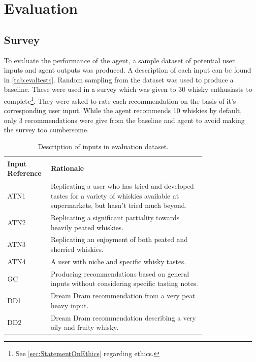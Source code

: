 \section{Evaluation}\label{sec:eval}
\subsection{Survey}\label{sec:survey}
To evaluate the performance of the agent, a sample dataset of potential user inputs and agent outputs 
was produced.  A description of each input can be found in \autoref{tab:evaltests}. Random sampling from the dataset was used to produce a baseline.  These were 
used in a survey which was given to 30 whisky enthusiasts to complete\footnote{See \autoref{sec:StatementOnEthics}
regarding ethics.}. They were asked to rate each recommendation on the basis of it's corresponding user input.  
While the agent recommends 10 whiskies by default, only 3 recommendations were give from the baseline and agent
to avoid making the survey too cumbersome.

\begin{table}
    \centering
    \caption{Description of inputs in evaluation dataset.}\label{tab:evaltests}
    \begin{tabular}{p{0.1\linewidth} p{0.7\linewidth}} 
    \toprule
    Input Reference & Rationale                                                                                                                                 \\ 
    \hline
    ATN1            & Replicating a user who has tried and developed tastes for a variety of whiskies available at supermarkets, but hasn't tried much beyond.  \\
    ATN2            & Replicating a significant partiality towards heavily peated whiskies.                                                                     \\
    ATN3            & Replicating an enjoyment of both peated and sherried whiskies.                                                                            \\
    ATN4            & A user with niche and specific whisky tastes.                                                                                             \\
    GC              & Producing recommendations based on general inputs without considering specific tasting notes.                                            \\
    DD1             & Dream Dram recommendation from a very peat heavy input.                                                                                   \\
    DD2             & Dream Dram recommendation describing a very oily and fruity whisky.                                                                       \\
    \bottomrule
    \end{tabular}
\end{table}

